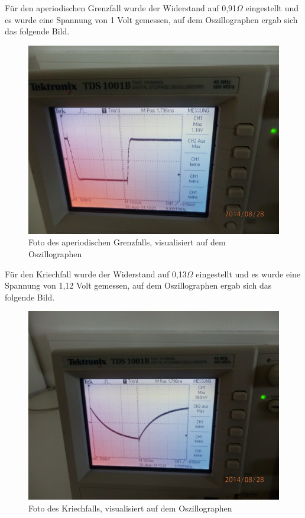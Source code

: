 \documentclass[12pt]{scrartcl}
\begin{document}
Für den aperiodischen Grenzfall wurde der Widerstand auf 0,91$\Omega$ eingestellt und es wurde eine Spannung von 1 Volt gemessen, auf dem Oszillographen ergab sich das folgende Bild.

\begin{figure}[H] 
  \centering
    \includegraphics[scale = 0.1]{aperiodischergrenzfall.JPG}
  	\caption[Foto des aperiodischen Grenzfalls, visualisiert auf dem Oszillographen]{Foto des aperiodischen Grenzfalls, visualisiert auf dem Oszillographen}
  \label{fig:aperiodischergrenzfall}
\end{figure}

Für den Kriechfall wurde der Widerstand auf 0,13$\Omega$ eingestellt und es wurde eine Spannung von 1,12 Volt gemessen, auf dem Oszillographen ergab sich das folgende Bild.

\begin{figure}[H] 
  \centering
    \includegraphics[scale = 0.1]{kriechfall.JPG}
  	\caption[Foto des Kriechfalls, visualisiert auf dem Oszillographen]{Foto des Kriechfalls, visualisiert auf dem Oszillographen}
  \label{fig:kriechfall}
\end{figure}
\end{document}
